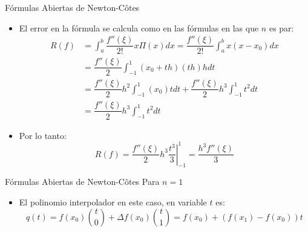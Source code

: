 \documentclass[12pt]{beamer}
\begin{document}
\begin{frame}{F\'ormulas Abiertas de Newton-C\^otes}
  \begin{itemize}
    \item El error en la fórmula se calcula como en las fórmulas en las que $n$ es par:
    \begin{align*}
      R(f) & = \int_{a}^{b}\dfrac{f''(\xi)}{2!}x\Pi(x)dx = \dfrac{f''(\xi)}{2!}\int_{a}^{b}x(x-x_0)dx\\
      & = \dfrac{f''(\xi)}{2}\int_{-1}^{1}(x_0+th)(th)hdt\\
      & = \dfrac{f''(\xi)}{2}h^2\int_{-1}^{1}(x_0)tdt + \dfrac{f''(\xi)}{2}h^3\int_{-1}^{1}t^2dt\\
      & = \dfrac{f''(\xi)}{2}h^3\int_{-1}^{1}t^2dt
    \end{align*}
    \item<2-> Por lo tanto:
    $$
    R(f) = \left.\dfrac{f''(\xi)}{2}h^3\dfrac{t^3}{3}\right|_{-1}^1 = \dfrac{h^3f''(\xi)}{3}
    $$
  \end{itemize}
\end{frame}
\begin{frame}{F\'ormulas Abiertas de Newton-C\^otes}
Para $n=1$
\begin{center}
\end{center}
\begin{itemize}
  \item El polinomio interpolador en este caso, en variable $t$ es:
  $$
    q(t) = f(x_0)\binom{t}{0}+\Delta f(x_0)\binom{t}{1} = f(x_0)+\left(f(x_1)-f(x_0)\right)t
  $$
  \end{itemize}
\end{frame}
\end{document}
